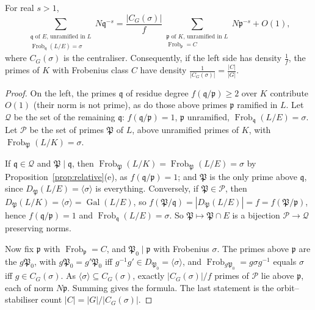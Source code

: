 \begin{lemma}[Deuring]\label{lem:deuring}
For real $s>1$,
\[
\sum_{\substack{\mathfrak q\text{ of }E\text{, unramified in }L\\ \operatorname{Frob}_{\mathfrak q}(L/E)=\sigma}}N\mathfrak q^{-s}
=\frac{|C_G(\sigma)|}f\sum_{\substack{\mathfrak p\text{ of }K\text{, unramified in }L\\ \operatorname{Frob}_{\mathfrak p}=C}}N\mathfrak p^{-s}+O(1),
\]
where $C_G(\sigma)$ is the centraliser. Consequently, if the left side has density $\frac1f$, the primes of $K$ with Frobenius class $C$ have
density $\frac1{|C_G(\sigma)|}=\frac{|C|}{|G|}$.
\end{lemma}
\begin{proof}
On the left, the primes $\mathfrak q$ of residue degree $f(\mathfrak q/\mathfrak p)\ge2$ over $K$ contribute $O(1)$ (their norm is not prime), as
do those above primes $\mathfrak p$ ramified in $L$. Let $\mathcal Q$ be the set of the remaining $\mathfrak q$: $f(\mathfrak q/\mathfrak
p)=1$, $\mathfrak p$ unramified, $\operatorname{Frob}_{\mathfrak q}(L/E)=\sigma$. Let $\mathcal P$ be the set of primes $\mathfrak P$ of $L$, above
unramified primes of $K$, with $\operatorname{Frob}_{\mathfrak P}(L/K)=\sigma$.

If $\mathfrak q\in\mathcal Q$ and $\mathfrak P\mid\mathfrak q$, then $\operatorname{Frob}_{\mathfrak P}(L/K)=\operatorname{Frob}_{\mathfrak
P}(L/E)=\sigma$ by Proposition~\ref{prop:relative}(e), as $f(\mathfrak q/\mathfrak p)=1$; and $\mathfrak P$ is the only prime above $\mathfrak q$,
since $D_{\mathfrak P}(L/E)=\langle\sigma\rangle$ is everything. Conversely, if $\mathfrak P\in\mathcal P$, then $D_{\mathfrak P}(L/K)=\langle
\sigma\rangle=\operatorname{Gal}(L/E)$, so $f(\mathfrak P/\mathfrak q)=|D_{\mathfrak P}(L/E)|=f=f(\mathfrak P/\mathfrak p)$, hence
$f(\mathfrak q/\mathfrak p)=1$ and $\operatorname{Frob}_{\mathfrak q}(L/E)=\sigma$. So $\mathfrak P\mapsto\mathfrak P\cap E$ is a bijection
$\mathcal P\to\mathcal Q$ preserving norms.

Now fix $\mathfrak p$ with $\operatorname{Frob}_{\mathfrak p}=C$, and $\mathfrak P_0\mid\mathfrak p$ with Frobenius $\sigma$. The primes above
$\mathfrak p$ are the $g\mathfrak P_0$, with $g\mathfrak P_0=g'\mathfrak P_0$ iff $g^{-1}g'\in D_{\mathfrak P_0}=\langle\sigma\rangle$, and
$\operatorname{Frob}_{g\mathfrak P_0}=g\sigma g^{-1}$ equals $\sigma$ iff $g\in C_G(\sigma)$. As $\langle\sigma\rangle\subseteq C_G(\sigma)$, exactly
$|C_G(\sigma)|/f$ primes of $\mathcal P$ lie above $\mathfrak p$, each of norm $N\mathfrak p$. Summing gives the formula. The last
statement is the orbit--stabiliser count $|C|=|G|/|C_G(\sigma)|$.
\end{proof}

